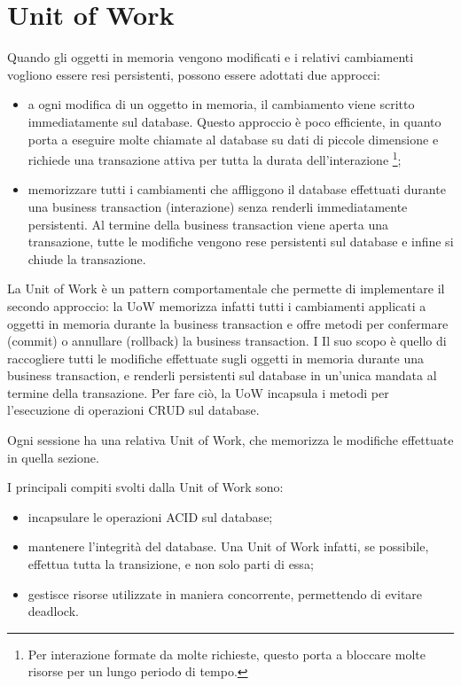 \section{Unit of Work}
Quando gli oggetti in memoria vengono modificati e i relativi cambiamenti vogliono essere resi persistenti, possono essere adottati due approcci:
\begin{itemize}
    \item a ogni modifica di un oggetto in memoria, il cambiamento viene scritto immediatamente sul database. Questo approccio è poco efficiente, in quanto porta a eseguire molte chiamate al database su dati di piccole dimensione e richiede una transazione attiva per tutta la durata dell'interazione \footnote{Per interazione formate da molte richieste, questo porta a bloccare molte risorse per un lungo periodo di tempo.};
    \item memorizzare tutti i cambiamenti che affliggono il database effettuati durante una business transaction (interazione) senza renderli immediatamente persistenti. Al termine della business transaction viene aperta una transazione, tutte le modifiche vengono rese persistenti sul database e infine si chiude la transazione.
\end{itemize}
La Unit of Work è un pattern comportamentale che permette di implementare il secondo approccio: la UoW memorizza infatti tutti i cambiamenti applicati a oggetti in memoria durante la business transaction e offre metodi per confermare (commit) o annullare (rollback) la business transaction. I  Il suo scopo è quello di raccogliere tutti le modifiche effettuate sugli oggetti in memoria durante una business transaction, e renderli persistenti sul database in un'unica mandata al termine della transazione.
Per fare ciò, la UoW incapsula i metodi per l'esecuzione di operazioni CRUD sul database.

Ogni sessione ha una relativa Unit of Work, che memorizza le modifiche effettuate in quella sezione.

I principali compiti svolti dalla Unit of Work sono:
\begin{itemize}
    \item incapsulare le operazioni ACID sul database;
    \item mantenere l'integrità del database. Una Unit of Work infatti, se possibile, effettua tutta la transizione, e non solo parti di essa;
    \item gestisce risorse utilizzate in maniera concorrente, permettendo di evitare deadlock.
\end{itemize}

